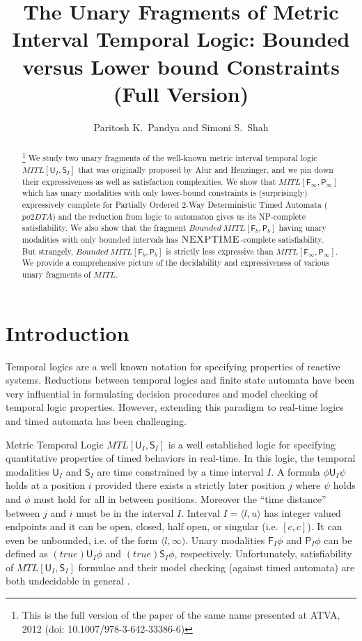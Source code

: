 \documentclass{llncs}
\newcommand{\class}{\textsc}
\newcommand{\until}{\textsf{U}}
\newcommand{\since}{\textsf{S}}
\newcommand{\fut}{\textsf{F}}
\newcommand{\past}{\textsf{P}}
\newcommand{\mtlus}{\mbox{$\mathit{MTL[\until_I,\since_I]}$}}
\newcommand{\mitlus}{\mbox{$\mathit{MITL[\until_I,\since_I]}$}}
\newcommand{\bmitlfp}{\mbox{$\mathit{Bounded ~MITL[\fut_b,\past_b]}$}}
\newcommand{\potdta}{\mbox{$\mathit{po2DTA}$}}
\newcommand{\mitlfpinf}{\mbox{$\mathit{MITL[\fut_\infty,\past_\infty]}$}}
\newcommand{\mitlfpb}{\bmitlfp}
\newcommand{\mitl}{\mbox{$\mathit{MITL}$}}
\newcommand{\nexptime}{\mbox{$\class{NEXPTIME}$}}
\begin{document}
\title{The Unary Fragments of Metric Interval Temporal Logic: Bounded versus Lower bound Constraints\\ (Full Version)}
\author{Paritosh K.~Pandya and Simoni S.~Shah}
\pagestyle{empty} 

\maketitle

\begin{abstract}
\footnote{This is the full version of the paper of the same name presented at ATVA, 2012 (doi: 10.1007/978-3-642-33386-6)}
We study two unary fragments of the well-known metric interval temporal logic $\mitlus$ that was
originally proposed by Alur and Henzinger, and we pin down their expressiveness
as well as satisfaction complexities. We show that $\mitlfpinf$ which has unary
modalities with only lower-bound constraints is (surprisingly) expressively complete for Partially Ordered 2-Way Deterministic Timed Automata ($\potdta$) and the reduction from logic to automaton gives us its NP-complete satisfiability. We also show that the fragment $\mitlfpb$ having unary modalities with only bounded intervals has \nexptime-complete satisfiability. But strangely, 
\mitlfpb\/ is strictly less expressive than \mitlfpinf. 
We provide a comprehensive picture of the decidability and expressiveness of various unary fragments of \mitl.
\end{abstract}


\section{Introduction}
Temporal logics are a well known notation for specifying properties of reactive systems.
Reductions between temporal logics and finite state automata have been very influential in formulating decision procedures and model checking of temporal logic properties. 
However, extending this paradigm to real-time logics and timed automata has been challenging.


Metric Temporal Logic $\mtlus$ is a well established logic for specifying quantitative properties of  timed behaviors in real-time. 
In this logic, the temporal modalities $\until_I$ and $\since_I$ are time constrained by a time interval $I$. 
A formula $\phi \until_I \psi$ holds at a position $i$ provided
there exists a strictly later position $j$ where $\psi$ holds and $\phi$ must hold for all in between positions. Moreover the ``time distance'' between $j$ and $i$ must be in the interval $I$. 
Interval $I = \langle l,u \rangle$ has integer valued endpoints  and it can be open, closed, half open, or singular (i.e. $[c,c]$). It can even be unbounded, i.e. of the form $\langle l,\infty)$.  Unary modalities $\fut_I \phi$ and $\past_I \phi$ can be defined as $(true) \until_I \phi$ and  $(true) \since_I \phi$, respectively. 
Unfortunately, satisfiability of $\mtlus$ formulae and their model checking (against timed automata) are both undecidable in general \cite{AH93,Hen91}.
\end{document}

